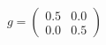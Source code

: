 \documentclass[preview]{standalone}
\begin{document}
\begin{align*}
g = \begin{pmatrix} 0.5 & 0.0 \\ 0.0 & 0.5 \end{pmatrix}
\end{align*}
\end{document}
